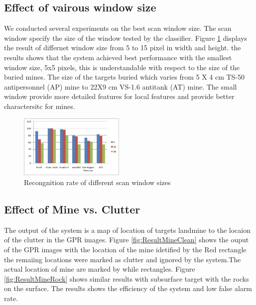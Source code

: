 \documentclass[conference]{IEEEtran}
\begin{document}
\subsection{Effect of vairous window size}
We conducted several experiments on the best scan window size. The scan window specify the size of the window tested by the classifier. Figure \ref{fig:ResultSize} displays the result of differnet window size from 5 to 15 pixel in width and height. the results shows that the system achieved best performance with the smallest window size, 5x5 pixels, this is understandable with respect to the size of the buried mines.  The size of the targets buried which varies from    5 X 4 cm  TS-50 antipersonnel (AP)  mine  to 22X9 cm VS-1.6 antitank (AT) mine. The small window provide more detailed features for local features and provide better charactersitc for mines.   %
  \begin{figure}
\centering
\label{fig:ResultSize}
\includegraphics[width=0.45\textwidth]{images/ResultSize.jpg}
 \caption{Recongnition rate of different scan window sizes}
\end{figure}


 \subsection{Effect of Mine vs. Clutter}

 The output of the system is a map of location of targets landmine to the locaion of the clutter in the GPR images. Figure \ref{fig:ResultMineClean} shows the ouput of the GPR images with the location of the mine idetified by the Red rectangle the remaiing locations were marked as clutter and ignored by the system.The actual location of mine are marked by while rectangles. Figure \ref{fig:ResultMineRock} shows similar results with subsurface target with the rocks on the surface. The results shows the efficiency of the system and low false alarm rate.
\end{document}
